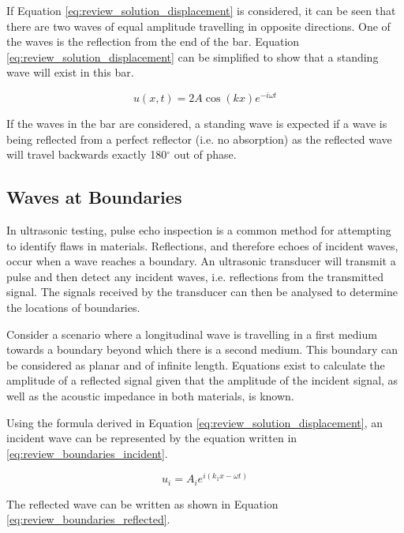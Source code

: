 If Equation \ref{eq:review_solution_displacement} is considered, it can be seen that there are two waves of equal amplitude travelling in opposite directions. One of the waves is the reflection from the end of the bar. Equation \ref{eq:review_solution_displacement} can be simplified to show that a standing wave will exist in this bar.

 \begin{equation} \label{eq:review_solution_standingwave}
u(x,t) = 2A\cos (kx)e^{-i \omega t}
 \end{equation}

If the waves in the bar are considered, a standing wave is expected if a wave is being reflected from a perfect reflector (i.e. no absorption) as the reflected wave will travel backwards exactly 180$^{\circ}$ out of phase.

\subsection{Waves at Boundaries} \label{sec:boundaries}

In ultrasonic testing, pulse echo inspection is a common method for attempting to identify flaws in materials. Reflections, and therefore echoes of incident waves, occur when a wave reaches a boundary. An ultrasonic transducer will transmit a pulse and then detect any incident waves, i.e. reflections from the transmitted signal. The signals received by the transducer can then be analysed to determine the locations of boundaries.

Consider a scenario where a longitudinal wave is travelling in a first medium towards a boundary beyond which there is a second medium. This boundary can be considered as planar and of infinite length. Equations exist to calculate the amplitude of a reflected signal given that the amplitude of the incident signal, as well as the acoustic impedance in both materials, is known.

Using the formula derived in Equation \ref{eq:review_solution_displacement}, an incident wave can be represented by the equation written in \ref{eq:review_boundaries_incident}.

\begin{equation} \label{eq:review_boundaries_incident}
u_{i} = A_{i}e^{i(k_{1}x - \omega t)}
\end{equation}

The reflected wave can be written as shown in Equation \ref{eq:review_boundaries_reflected}.

